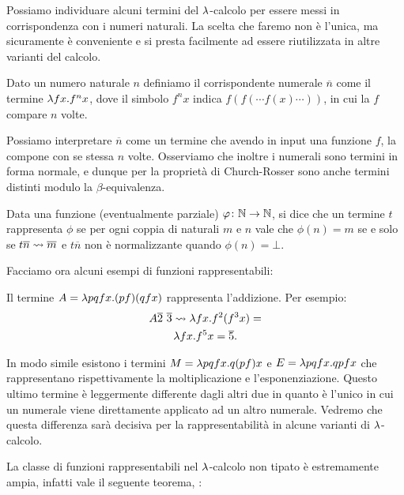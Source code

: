 \documentclass[]{marticle}
\begin{document}
Possiamo individuare alcuni termini del $\lambda$-calcolo per essere messi in
corrispondenza con i numeri naturali. La scelta che faremo non \`e l'unica, ma
sicuramente \`e conveniente e si presta facilmente ad essere riutilizzata in
altre varianti del calcolo.

\begin{block}[Definizione]
    Dato un numero naturale $n$ definiamo il corrispondente numerale
    $\overline{n}$ come il termine $\lambda f x. f^n x$, dove il simbolo $f^n x$
    indica $f(f(\cdots f(x) \cdots))$, in cui la $f$ compare $n$ volte.
\end{block}

Possiamo interpretare $\overline{n}$ come un termine che avendo in input una
funzione $f$, la compone con se stessa $n$ volte. Osserviamo che inoltre i
numerali sono termini in forma normale, e dunque per la propriet\`a di
Church-Rosser sono anche termini distinti modulo la $\beta$-equivalenza.

\begin{block}[Definizione]
    Data una funzione (eventualmente parziale) $\varphi\colon \mathbb{N} \rightarrow \mathbb{N}$,
    si dice che un termine $t$ rappresenta $\phi$ se per ogni coppia di naturali
    $m$ e $n$ vale che $\phi(n)=m$ se e solo se $t\overline{n}\rightsquigarrow\overline{m}$
    e $t\overline{n}$ non \`e normalizzante quando $\phi(n)=\bot$.
\end{block}

Facciamo ora alcuni esempi di funzioni rappresentabili:
\begin{block}[Esempio]
    Il termine $A = \lambda pq fx. (pf)(qfx)$ rappresenta l'addizione. Per esempio:
    \begin{gather*}
        A\overline{2}\ \overline{3} \rightsquigarrow \lambda fx. f^2 (f^3 x) = \\
        \lambda fx. f^5 x = \overline{5}.
    \end{gather*}


    In modo simile esistono i termini $M = \lambda p q f x. q (p f) x$ e $E = \lambda p q
    f x. qpfx$ che rappresentano rispettivamente la moltiplicazione e
    l'esponenziazione. Questo ultimo termine \`e leggermente differente dagli
    altri due in quanto \`e l'unico in cui un numerale viene direttamente
    applicato ad un altro numerale. Vedremo che questa differenza sar\`a
    decisiva per la rappresentabilit\`a in alcune varianti di $\lambda$-calcolo.
\end{block}

La classe di funzioni rappresentabili nel $\lambda$-calcolo non tipato \`e
estremamente ampia, infatti vale il seguente teorema, :
\end{document}
